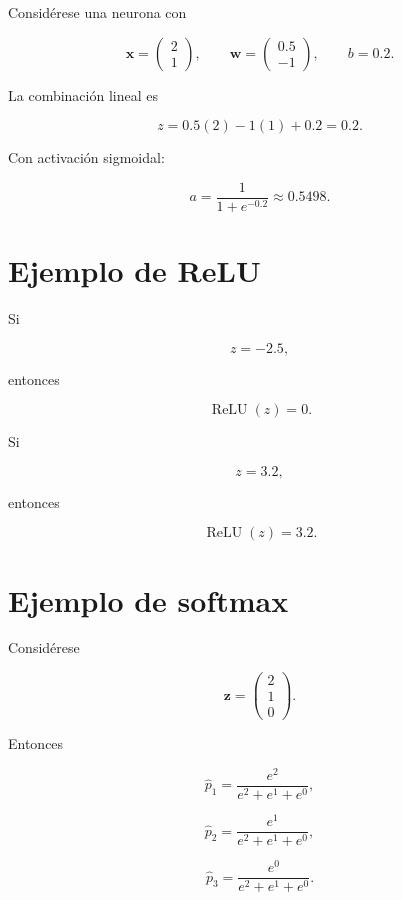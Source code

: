 \documentclass[
  spanish,
  10.5pt,
  letterpaper,
  DIV=11,
  numbers=noendperiod,
  oneside,
  open=any]{scrreprt}
\theoremstyle{definition}
\theoremstyle{definition}
\theoremstyle{plain}
\theoremstyle{remark}
\begin{document}

Considérese una neurona con

\[
\mathbf{x}
=
\begin{pmatrix}
2\\
1
\end{pmatrix},
\qquad
\mathbf{w}
=
\begin{pmatrix}
0.5\\
-1
\end{pmatrix},
\qquad
b=0.2.
\]

La combinación lineal es

\[
z
=
0.5(2)-1(1)+0.2
=
0.2.
\]

Con activación sigmoidal:

\[
a
=
\frac{1}{1+e^{-0.2}}
\approx
0.5498.
\]

\section*{Ejemplo de ReLU}\label{ejemplo-de-relu}


Si

\[
z=-2.5,
\]

entonces

\[
\operatorname{ReLU}(z)=0.
\]

Si

\[
z=3.2,
\]

entonces

\[
\operatorname{ReLU}(z)=3.2.
\]

\section*{Ejemplo de softmax}\label{ejemplo-de-softmax}


Considérese

\[
\mathbf{z}
=
\begin{pmatrix}
2\\
1\\
0
\end{pmatrix}.
\]

Entonces

\[
\widehat{p}_1
=
\frac{e^2}{e^2+e^1+e^0},
\]

\[
\widehat{p}_2
=
\frac{e^1}{e^2+e^1+e^0},
\]

\[
\widehat{p}_3
=
\frac{e^0}{e^2+e^1+e^0}.
\]
\end{document}
